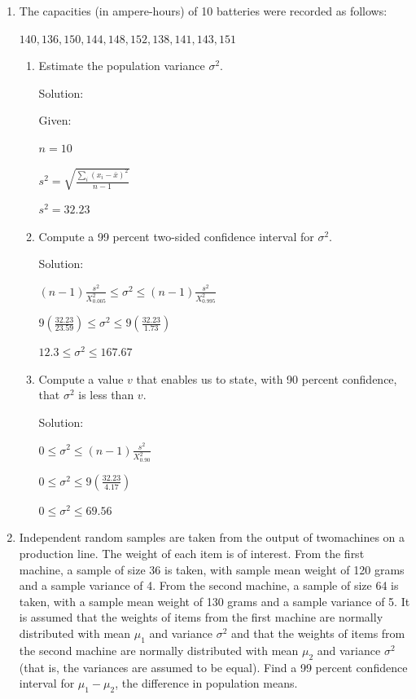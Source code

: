 \documentclass{article}
\begin{document}
\begin{enumerate}
\begin{enumerate}
    \end{enumerate}
    \item The capacities (in ampere-hours) of 10 batteries were recorded as follows:
    
    $140, 136, 150, 144, 148, 152, 138, 141, 143, 151$

    \begin{enumerate}
        \item Estimate the population variance $\sigma^2$.
        
        Solution: 

        Given:
        
        $n = 10$

        $\displaystyle s^2=\sqrt{\frac{\sum_i{(x_i-\bar{x})^2}}{n-1}}$

        $s^2 = 32.23$

        \item Compute a 99 percent two-sided confidence interval for $\sigma^2$.
        
        Solution: 

        $(n-1)\frac{s^2}{X_{0.005}^2} \leq \sigma^2 \leq (n-1)\frac{s^2}{X_{0.995}^2}$

        $\displaystyle 9\left(\frac{32.23}{23.59}\right) \leq \sigma^2 \leq 9\left(\frac{32.23}{1.73}\right)$

        $12.3 \leq \sigma^2 \leq 167.67$

        \item Compute a value $v$ that enables us to state, with 90 percent confidence, that $\sigma^2$ is less than $v$.
        
        Solution: 

        $0 \leq \sigma^2 \leq (n-1)\frac{s^2}{X_{0.90}^2}$

        $0 \leq \sigma^2 \leq 9\left(\frac{32.23}{4.17}\right)$

        $0 \leq \sigma^2 \leq 69.56$

    \end{enumerate}
    \item Independent random samples are taken from the output of twomachines on a production line. 
    The weight of each item is of interest. From the first machine, a sample of size 36 is taken, with sample mean weight of 120 grams and a sample variance of 4.
    From the second machine, a sample of size 64 is taken, with a sample mean weight of 130 grams and a sample variance of 5.
    It is assumed that the weights of items from the first machine are normally distributed with mean $\mu_1$ and variance $\sigma^2$ and that the weights of items from the second machine are normally distributed with mean $\mu_2$ and variance $\sigma^2$ (that is, the variances are assumed to be equal). 
    Find a 99 percent confidence interval for $\mu_1 - \mu_2$, the difference in population means.
    

\end{enumerate}
\end{document}
